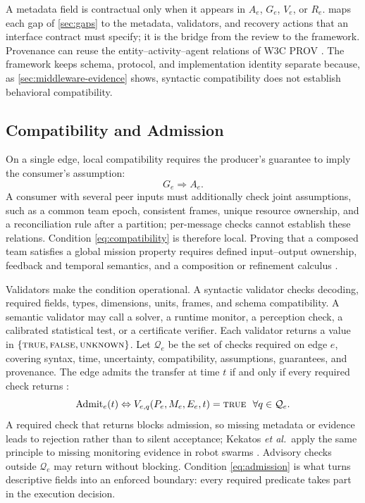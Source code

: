 A metadata field is contractual only when it appears in $A_e$, $G_e$, $V_e$, or
$R_e$.   maps each gap of \cref{sec:gaps} to the metadata,
validators, and recovery actions that an interface contract must specify; it is
the bridge from the review to the framework.  Provenance can reuse the
entity--activity--agent relations of W3C PROV \cite{w3c2013prov}.  The framework
keeps schema, protocol, and implementation identity separate because, as
\cref{sec:middleware-evidence} shows, syntactic compatibility does not establish
behavioral compatibility.

\subsection{Compatibility and Admission}
\label{sec:admission}

On a single edge, local compatibility requires the producer's guarantee to imply
the consumer's assumption:
\begin{equation}
  G_e\Longrightarrow A_e.
  \label{eq:compatibility}
\end{equation}
A consumer with several peer inputs must additionally check joint assumptions,
such as a common team epoch, consistent frames, unique resource ownership, and a
reconciliation rule after a partition; per-message checks cannot establish these
relations.  Condition \eqref{eq:compatibility} is therefore local.  Proving
that a composed team satisfies a global mission property requires defined
input--output ownership, feedback and temporal semantics, and a composition or
refinement calculus \cite{luckcuck2026compositional,mallozzi2023repair}.

Validators make the condition operational.  A syntactic validator checks
decoding, required fields, types, dimensions, units, frames, and schema
compatibility.  A semantic validator may call a solver, a runtime monitor, a
perception check, a calibrated statistical test, or a certificate verifier.
Each validator returns a value in $\{\textsc{true},\textsc{false},\textsc{unknown}\}$.  Let
$\mathcal Q_e$ be the set of checks required on edge $e$, covering syntax,
time, uncertainty, compatibility, assumptions, guarantees, and provenance.
The edge admits the transfer at time $t$ if and only if every required check
returns \true:
\begin{equation}
  \operatorname{Admit}_e(t)\Leftrightarrow
  V_{e,q}(P_e,M_e,E_e,t)=\textsc{true}\ \ \forall q\in\mathcal Q_e.
  \label{eq:admission}
\end{equation}
A required check that returns \unknown{} blocks admission, so missing metadata
or evidence leads to rejection rather than to silent acceptance; Kekatos
\emph{et al.}\ apply the same principle to missing monitoring evidence in robot
swarms \cite{kekatos2026swarmrta}.  Advisory checks outside $\mathcal Q_e$ may
return \unknown{} without blocking.  Condition \eqref{eq:admission} is what turns
descriptive fields into an enforced boundary: every required predicate takes
part in the execution decision.

